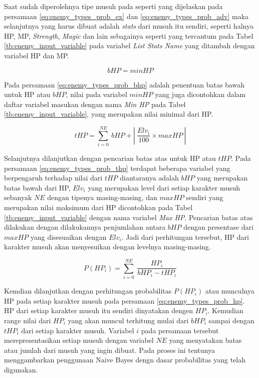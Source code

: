 Saat sudah diperolehnya tipe musuh pada seperti yang dijelaskan pada persamaan \ref{eq:enemy_types_prob_ex} dan \ref{eq:enemy_types_prob_adv} maka selanjutnya yang harus dibuat adalah \textit{stats} dari musuh itu sendiri, seperti halnya HP, MP, \textit{Strength}, \textit{Magic} dan lain sebagainya seperti yang tercantum pada Tabel \ref{tb:enemy_input_variable} pada variabel \textit{List Stats Name} yang ditambah dengan variabel HP dan MP.
\vspace{1ex}

\begin{equation}\label{eq:enemy_types_prob_bhp}
bHP = minHP
\end{equation}

Pada persamaan \ref{eq:enemy_types_prob_bhp} adalah penentuan batas bawah untuk HP atau $bHP$, nilai pada variabel $minHP$ yang juga dicontohkan dalam daftar variabel masukan dengan nama \textit{Min HP} pada Tabel \ref{tb:enemy_input_variable}, yang merupakan nilai minimal dari HP.
\vspace{1ex}

\begin{equation}\label{eq:enemy_types_prob_thp}
tHP = \sum_{i=0}^{NE}\ bHP + \left |\ \frac{Elv_{i}}{100} \times maxHP\ \right |
\end{equation}

Selanjutnya dilanjutkan dengan pencarian batas atas untuk HP atau $tHP$. Pada persamaan \ref{eq:enemy_types_prob_thp} terdapat beberapa variabel yang berpengaruh terhadap nilai dari $tHP$ diantaranya adalah $bHP$ yang merupakan batas bawah dari HP, $Elv_{i}$ yang merupakan level dari setiap karakter musuh sebanyak $NE$ dengan tipenya masing-masing, dan $maxHP$ sendiri yang merupakan nilai maksimum dari HP dicontohkan pada Tabel \ref{tb:enemy_input_variable} dengan nama variabel \textit{Max HP}. Pencarian batas atas dilakukan dengan dilakukannya penjumlahan antara $bHP$ dengan presentase dari $maxHP$ yang disesuaikan dengan $Elv_{i}$. Jadi dari perhitungan tersebut, HP dari karakter musuh akan menyesuikan dengan levelnya masing-masing. 
\vspace{1ex}

\begin{equation}\label{eq:enemy_types_prob_hp}
P(HP_{i}) = \sum_{i=0}^{NE}\ \frac{HP_{i}}{bHP_{i} - tHP_{i}}
\end{equation}

Kemdian dilanjutkan dengan perhitungan probabilitas $P(HP_{i})$ atau munculnya HP pada setiap karakter musuh pada persamaan \ref{eq:enemy_types_prob_hp}. HP dari setiap karakter musuh itu sendiri dinyatakan dengen $HP_{i}$. Kemudian range nilai dari $HP_{i}$ yang akan muncul terhitung mulai dari $bHP_{i}$ sampai dengan $tHP_{i}$ dari setiap karakter musuh. Variabel $i$ pada persamaan tersebut merepresentasikan setiap musuh dengan variabel $NE$ yang menyatakan batas atau jumlah dari musuh yang ingin dibuat. Pada proses ini tentunya menggambarkan penggunaan Naive Bayes dengn dasar probabilitas yang telah digunakan.

